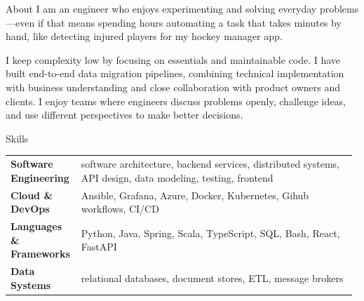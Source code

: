 \documentclass[
	a4paper, %
	10pt, %
]{resume} %
\begin{document}

\begin{rSection}{About}
	\begingroup\small
	I am an engineer who enjoys experimenting and solving everyday problems—even if that means spending hours automating a task that takes minutes by hand, like detecting injured players for my hockey manager app.

	I keep complexity low by focusing on essentials and maintainable code. I have built end-to-end data migration pipelines, combining technical implementation with business understanding and close collaboration with product owners and clients. I enjoy teams where engineers discuss problems openly, challenge ideas, and use different perspectives to make better decisions.
	\endgroup
\end{rSection}




\begin{rSection}{Skills}
	\begin{tabular}{@{}p{0.20\linewidth} p{0.78\linewidth}@{}}
		\textbf{Software Engineering}     & software architecture, backend services, distributed systems, API design, data modeling, testing, frontend \\
		\textbf{Cloud \& DevOps}          & Ansible, Grafana, Azure, Docker, Kubernetes, Gihub workflows, CI/CD \\
		\textbf{Languages \& Frameworks}  & Python, Java, Spring, Scala, TypeScript, SQL, Bash, React, FastAPI \\
		\textbf{Data Systems}             & relational databases, document stores, ETL, message brokers \\
	\end{tabular}
\end{rSection}

\end{document}
